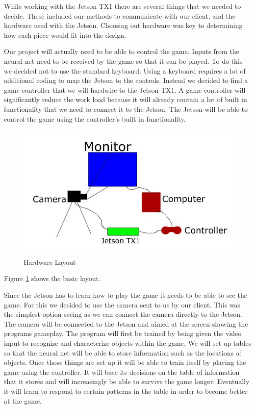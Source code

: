 \documentclass{scrreprt}
\begin{document}
While working with the Jetson TX1 there are several things that we needed to decide.
These included our methods to communicate with our client, and the hardware used with the Jetson.
Choosing out hardware was key to determining how each piece would fit into the design.
\newline

Our project will actually need to be able to control the game.
Inputs from the neural net need to be received by the game so that it can be played.
To do this we decided not to use the standard keyboard.
Using a keyboard requires a lot of additional coding to map the Jetson to the controls.
Instead we decided to find a game controller that we will hardwire to the Jetson TX1.
A game controller will significantly reduce the work load because it will already contain a lot of built in functionality that we need to connect it to the Jetson.
The Jetson will be able to control the game using the controller's built in functionality.
\newline

\begin{figure}
  \includegraphics[natwidth=100,natheight=200]{design.JPG}
  \caption{Hardware Layout}
  \label{fig:4.3}
\end{figure}
Figure \ref{fig:4.3} shows the basic layout.

Since the Jetson has to learn how to play the game it needs to be able to see the game.
For this we decided to use the camera sent to us by our client.
This was the simplest option seeing as we can connect the camera directly to the Jetson.
The camera will be connected to the Jetson and aimed at the screen showing the programs gameplay.
The program will first be trained by being given the video input to recognize and characterize objects within the game.
We will set up tables so that the neural net will be able to store information such as the locations of objects.
Once those things are set up it will be able to train itself by playing the game using the controller.
It will base its decisions on the table of information that it stores and will increasingly be able to survive the game longer.
Eventually it will learn to respond to certain patterns in the table in order to become better at the game.
\end{document}

